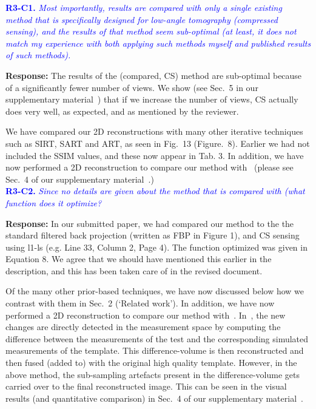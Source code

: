 \documentclass{article}
\begin{document}
\textcolor{blue}{\textbf{R3-C1.}\textit{ Most importantly, results are compared with only a single existing method that is specifically designed for low-angle tomography (compressed sensing), and the results of that method seem sub-optimal (at least, it does not match my experience with both applying such methods myself and published results of such methods). }}

\textbf{ Response:} The results of the (compared, CS) method are sub-optimal because of a significantly fewer number of views.  We show  (see Sec.~5 in our supplementary material~\cite{supp_paper}) that if we increase the number of views, CS actually does very well, as expected, and as mentioned by the reviewer.

We have compared our 2D reconstructions with many other iterative techniques such as SIRT, SART and ART, as seen in Fig.~13 (Figure.~8). Earlier we had not included the SSIM values,  and these now appear in Tab. 3.  In addition, we have now performed a 2D reconstruction to compare our method with~\cite{Lee2012} (please see Sec.~4 of our supplementary material~\cite{supp_paper}.)\\

\textcolor{blue}{\textbf{R3-C2.}\textit{ Since no details are given about the method that is compared with (what function does it optimize?}}

\textbf{ Response:} In our submitted paper, we had compared our method to the the standard filtered back projection (written as FBP in Figure 1), and CS sensing using l1-ls (e.g. Line 33, Column 2, Page 4). The function optimized was given in Equation 8. We agree that we should have mentioned this earlier in the description, and this has been taken care of in the revised document. 

Of the many other prior-based techniques, we have now discussed  below how we contrast with them in Sec.~2 (`Related work'). In addition, we have now performed a 2D reconstruction to compare our method with~\cite{Lee2012}. In~\cite{Lee2012}, the new changes are directly detected in the measurement space by computing the difference between the measurements of the test and the corresponding simulated measurements of the template. This difference-volume is then reconstructed and then fused (added to) with the original high quality template.
However, in the above method, the sub-sampling artefacts present in the difference-volume gets carried over to the final reconstructed image. This can be seen in the visual results (and quantitative comparison) in Sec.~4 of our supplementary material~\cite{supp_paper}.\\
\end{document}
